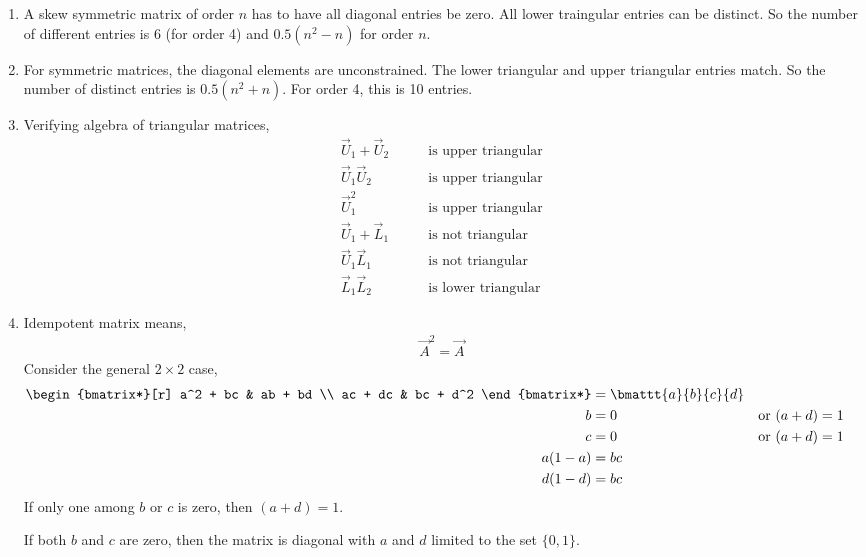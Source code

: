 \begin{enumerate}
    \item A skew symmetric matrix of order $ n $ has to have all diagonal entries
          be zero. All lower traingular entries can be distinct. So the number of
          different entries is 6 (for order 4) and $ 0.5(n^2 - n) $ for order $ n $.

    \item For symmetric matrices, the diagonal elements are unconstrained. The
          lower triangular and upper triangular entries match. So the number of distinct
          entries is $ 0.5(n^2 + n) $. For order 4, this is 10 entries.

    \item Verifying algebra of triangular matrices,
          \begin{align}
              \vec{U}_1 + \vec{U}_2 & \qquad  \text{is upper triangular} \\
              \vec{U}_1\vec{U}_2    & \qquad  \text{is upper triangular} \\
              \vec{U}_1^2           & \qquad  \text{is upper triangular} \\
              \vec{U}_1 + \vec{L}_1 & \qquad  \text{is not triangular}   \\
              \vec{U}_1 \vec{L}_1   & \qquad  \text{is not triangular}   \\
              \vec{L}_1 \vec{L}_2   & \qquad  \text{is lower triangular}
          \end{align}

    \item Idempotent matrix means,
          \begin{align}
              \vec{A}^2 = \vec{A}
          \end{align}
          Consider the general $ 2 \times 2 $ case,
          \begin{align}
              \begin{bmatrix*}[r]
                  a^2 + bc & ab + bd \\
                  ac + dc & bc + d^2
              \end{bmatrix*} & = \bmattt{a}{b}{c}{d}                                  \\
              b                     & = 0                   & \text{or}\  & (a+d) = 1 \\
              c                     & = 0                   & \text{or}\  & (a+d) = 1 \\
              a(1 - a)              & = bc                                            \\
              d(1 - d)              & = bc                                            \\
          \end{align}
          If only one among $ b $ or $ c $ is zero, then $ (a + d) = 1 $. \par
          If both $ b $ and $ c $ are zero, then the matrix is diagonal with $ a $ and
          $ d $ limited to the set $ \{0, 1\} $.


\end{enumerate}
